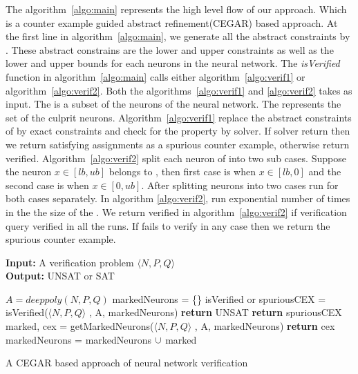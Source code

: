 The algorithm~\ref{algo:main} represents the high level flow of our approach. Which is a counter example guided abstract refinement(CEGAR) based approach. 
At the first line in algorithm~\ref{algo:main}, we generate all the abstract constraints by \deeppoly{}. These abstract constrains
are the lower and upper constraints as well as the lower and upper bounds for each neurons in the neural network.
The \emph{isVerified} function in algorithm~\ref{algo:main} calls either algorithm~\ref{algo:verif1} or algorithm~\ref{algo:verif2}. 
Both the algorithms~\ref{algo:verif1} and \ref{algo:verif2} takes \markednewrons{} as input. The \markednewrons{} 
is a subset of the neurons of the neural network. The \markednewrons{} represents the set of the culprit neurons. 
Algorithm~\ref{algo:verif1} replace the abstract constraints of \markednewrons{} by exact constraints and check for the 
property by \milp{} solver. If \milp{} solver return \sat{} then we return satisfying assignments as a spurious counter example, 
otherwise return verified. Algorithm~\ref{algo:verif2} split each neuron of \markednewrons{} into two sub cases. Suppose the 
neuron $x\in [lb,ub]$ belongs to \markednewrons{}, then first case is when $x \in [lb,0]$ and the second case is when $x \in [0,ub]$.   
After splitting neurons into two cases \deeppoly{} run for both cases separately. In algorithm \ref{algo:verif2}, \deeppoly{}
run exponential number of times in the the size of the \markednewrons{}. We return verified in algorithm~\ref{algo:verif2} if 
verification query verified in all the \deeppoly{} runs. If \deeppoly{} fails to verify in any case then we return the spurious counter example. 


\begin{algorithm}[t]
  \textbf{Input: } A verification problem $\langle N,P,Q \rangle$ \\
  \textbf{Output: } UNSAT or SAT
  \begin{algorithmic}[1]
    \State $A = deeppoly(N,P,Q)$
    \State markedNeurons = \{\}
      \State isVerified or spuriousCEX = isVerified($\langle N,P,Q \rangle$ , A, markedNeurons)
        \State \textbf{return} UNSAT
      \Else
          \State \textbf{return} spuriousCEX
        \Else
          \State marked, cex = getMarkedNeurons($\langle N,P,Q \rangle$ , A, markedNeurons)
            \State \textbf{return} cex
          \EndIf
          \State markedNeurons = markedNeurons ${\cup}$ marked
        \EndIf
      \EndIf
    \EndWhile
  \end{algorithmic}
  \caption{A CEGAR based approach of neural network verification}
  \label{algo:main}
\end{algorithm}

